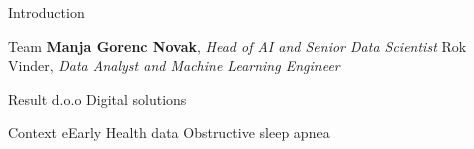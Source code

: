 \begin{frame}{Introduction}

\begin{outline}
    \1 Team
        \2 \textbf{Manja Gorenc Novak}, \emph{Head of AI and Senior Data Scientist}
        \2 Rok Vinder, \emph{Data Analyst and Machine Learning Engineer}

    \1 Result d.o.o
        \2 Digital solutions

    \1 Context
        \2 eEarly %
            \3 Health data
            \3 Obstructive sleep apnea
\end{outline}

\end{frame}
